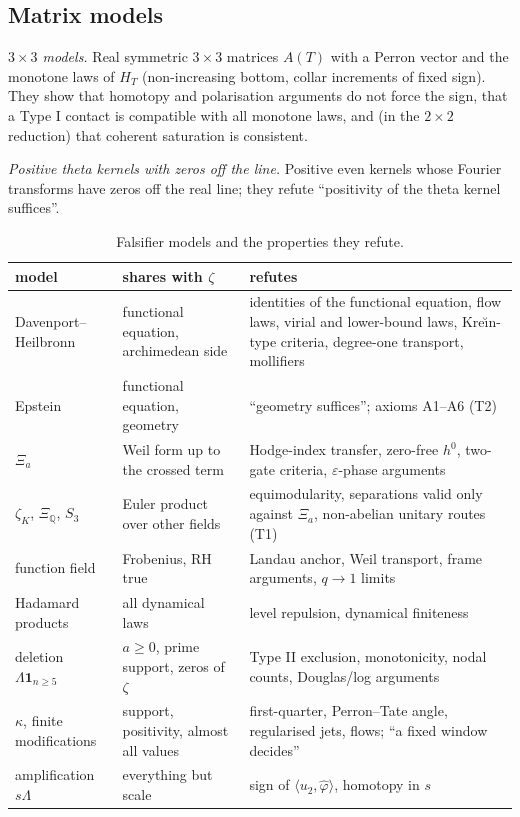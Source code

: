 \documentclass[11pt]{amsart}
\theoremstyle{definition}
\theoremstyle{remark}
\newcommand{\Q}{\mathbb Q}
\begin{document}
\subsection{Matrix models}
\emph{$3\times3$ models.} Real symmetric $3\times3$ matrices $A(T)$ with a Perron vector and the monotone
laws of $H_T$ (non-increasing bottom, collar increments of fixed sign). They show that homotopy and
polarisation arguments do not force the sign, that a Type I contact is compatible with all monotone laws,
and (in the $2\times2$ reduction) that coherent saturation is consistent.

\emph{Positive theta kernels with zeros off the line.} Positive even kernels whose Fourier transforms
have zeros off the real line; they refute ``positivity of the theta kernel suffices''.

\begin{table}[ht]
\centering\small
\caption{Falsifier models and the properties they refute.}\label{tab:falsifiers}
\begin{tabularx}{\textwidth}{@{}p{3.3cm}p{4.0cm}Y@{}}
\toprule
model & shares with $\zeta$ & refutes \\
\midrule
Davenport--Heilbronn & functional equation, archimedean side & identities of the functional equation, flow laws, virial and lower-bound laws, Kre\u{\i}n-type criteria, degree-one transport, mollifiers \\
Epstein & functional equation, geometry & ``geometry suffices''; axioms A1--A6 (T2) \\
$\Xi_a$ & Weil form up to the crossed term & Hodge-index transfer, zero-free $h^0$, two-gate criteria, $\varepsilon$-phase arguments \\
$\zeta_K$, $\Xi_\Q$, $S_3$ & Euler product over other fields & equimodularity, separations valid only against $\Xi_a$, non-abelian unitary routes (T1) \\
function field & Frobenius, RH true & Landau anchor, Weil transport, frame arguments, $q\to1$ limits \\
Hadamard products & all dynamical laws & level repulsion, dynamical finiteness \\
deletion $\Lambda\mathbf1_{n\ge5}$ & $a\ge0$, prime support, zeros of $\zeta$ & Type II exclusion, monotonicity, nodal counts, Douglas/log arguments \\
$\kappa$, finite modifications & support, positivity, almost all values & first-quarter, Perron--Tate angle, regularised jets, flows; ``a fixed window decides'' \\
amplification $s\Lambda$ & everything but scale & sign of $\langle u_2,\hat\varphi\rangle$, homotopy in $s$ \\

\end{tabularx}
\end{table}
\end{document}
